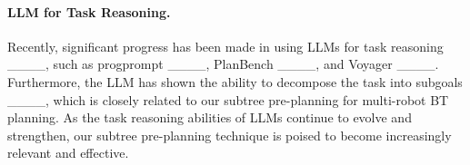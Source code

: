 \paragraph{LLM for Task Reasoning.} Recently, significant progress has been made in using LLMs for task reasoning ____, such as progprompt ____, PlanBench ____, and Voyager ____. Furthermore, the LLM has shown the ability to decompose the task into subgoals ____, which is closely related to our subtree pre-planning for multi-robot BT planning. As the task reasoning abilities of LLMs continue to evolve and strengthen, our subtree pre-planning technique is poised to become increasingly relevant and effective.
